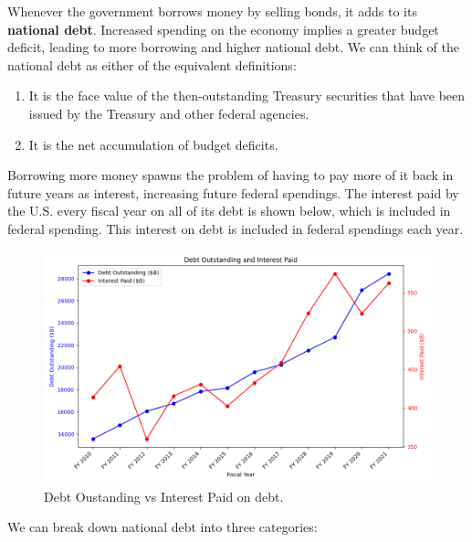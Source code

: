 \documentclass{article}
\begin{document}
    Whenever the government borrows money by selling bonds, it adds to its \textbf{national debt}. Increased spending on the economy implies a greater budget deficit, leading to more borrowing and higher national debt. We can think of the national debt as either of the equivalent definitions: 

    \begin{enumerate}
      \item It is the face value of the then-outstanding Treasury securities that have been issued by the Treasury and other federal agencies.
      \item It is the net accumulation of budget deficits.
    \end{enumerate}

    Borrowing more money spawns the problem of having to pay more of it back in future years as interest, increasing future federal spendings. The interest paid by the U.S. every fiscal year on all of its debt is shown below, which is included in federal spending. This interest on debt is included in federal spendings each year. 

    \begin{figure}[H]
      \centering 
      \includegraphics[scale=0.55]{img/debt_interest_paid.png}
      \caption{Debt Oustanding vs Interest Paid on debt.} 
      \label{fig:debt_interest_paid}
    \end{figure}

    We can break down national debt into three categories:
\end{document}
